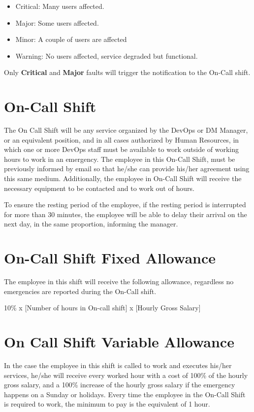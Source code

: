 \begin{itemize}
    \item Critical: Many users affected. 
    \item Major: Some users affected.
    \item Minor: A couple of users are affected
    \item Warning: No users affected, service degraded but functional. 
\end{itemize}

Only \textbf{Critical} and \textbf{Major} faults will trigger the notification to the On-Call shift. 


\section{On-Call Shift}

The On Call Shift will be any service organized by the DevOps or DM Manager, or an equivalent position, and in all cases authorized by Human Resources, in which one or more DevOps staff must be available to work outside of working hours to work in an emergency. 
The employee in this On-Call Shift, must be previously informed by email so that he/she can provide his/her agreement using this same medium. Additionally, the employee in On-Call Shift will receive the necessary equipment to be contacted and to work out of hours. 

To ensure the resting period of the employee, if the resting period is interrupted for more than 30 minutes, the employee will be able to delay their arrival on the next day, in the same proportion, informing the manager.

\section{On-Call Shift Fixed Allowance}

The employee in this shift will receive the following allowance, regardless no emergencies are reported during the On-Call shift.

10\% x [Number of hours in On-call shift] x [Hourly Gross Salary]


\section{On Call Shift Variable Allowance}

In the case the employee in this shift is called to work and executes his/her services, he/she will receive every worked hour with a cost of 100\% of the hourly gross salary, and a 100\% increase of the hourly gross salary if the emergency happens on a Sunday or holidays. Every time the employee in the On-Call Shift is required to work, the minimum to pay is the equivalent of 1 hour. 

